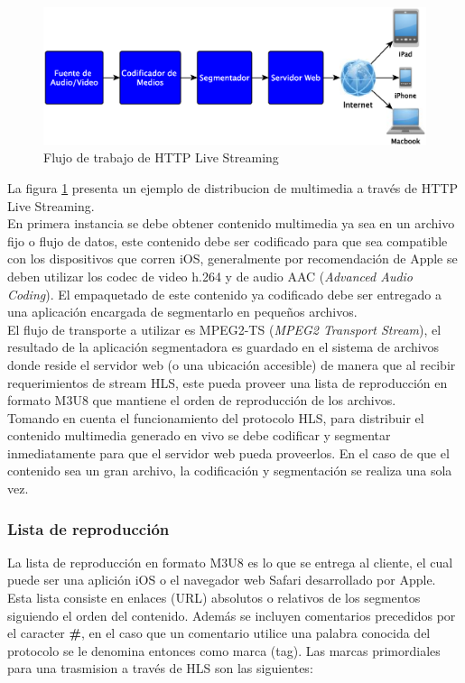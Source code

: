 \begin{figure}[H]
	\centering
	\includegraphics[scale=0.5]{imgs/HLS_diagram_wwdc2010.eps}
	\caption{Flujo de trabajo de HTTP Live Streaming}	
	\label{diagramaHLSwwdc2010}
\end{figure}		
		La figura \ref{diagramaHLSwwdc2010} presenta un ejemplo de distribucion de multimedia a través de HTTP Live Streaming.\\
		
En primera instancia se debe obtener contenido multimedia ya sea en un archivo fijo o flujo de datos, este contenido debe ser codificado para que sea compatible con los dispositivos que corren iOS, generalmente por recomendación de Apple se deben utilizar los codec de video h.264 y de audio AAC (\textit{Advanced Audio Coding}). El empaquetado de este contenido ya codificado debe ser entregado a una aplicación encargada de segmentarlo en pequeños archivos. \\

	El flujo de transporte a utilizar es MPEG2-TS (\textit{MPEG2 Transport Stream}), el resultado de la aplicación segmentadora es guardado en el sistema de archivos donde reside el servidor web (o una ubicación accesible) de manera que al recibir requerimientos de stream HLS, este pueda proveer una lista de reproducción en formato M3U8 que mantiene el orden de reproducción de los archivos.\\
	
Tomando en cuenta el funcionamiento del protocolo HLS, para distribuir el contenido multimedia generado en vivo se debe codificar y segmentar inmediatamente para que el servidor web pueda proveerlos. En el caso de que el contenido sea un gran archivo, la codificación y segmentación se realiza una sola vez.

\subsubsection{Lista de reproducción}
\label{TAG-SECTION}
La lista de reproducción en formato M3U8 es lo que se entrega al cliente, el cual puede ser una aplición iOS o el navegador web Safari desarrollado por Apple. Esta lista consiste en enlaces (URL) absolutos o relativos de los segmentos siguiendo el orden del contenido. Además se incluyen comentarios precedidos por el caracter \textbf{\#}, en el caso que un comentario utilice una palabra conocida del protocolo se le denomina entonces como marca (tag).
Las marcas primordiales para una trasmision a través de HLS son las siguientes:

